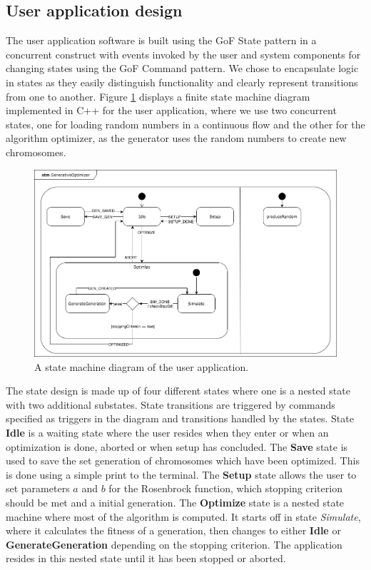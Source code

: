 \subsection{User application design}

The user application software is built using the GoF State pattern in a concurrent construct with events invoked by the user and system components for changing states using the GoF Command pattern. We chose to encapsulate logic in states as they easily distinguish functionality and clearly represent transitions from one to another. Figure \ref{fig:statemachine} displays a finite state machine diagram implemented in C++ for the user application, where we use two concurrent states, one for loading random numbers in a continuous flow and the other for the algorithm optimizer, as the generator uses the random numbers to create new chromosomes.

\begin{figure}[h!]
	\centering
	\includegraphics[width=0.9\linewidth]{../diagrams/statemachine.png}
	\caption{A state machine diagram of the user application.}
	\label{fig:statemachine}
\end{figure}

The state design is made up of four different states where one is a nested state with two additional substates.
State transitions are triggered by commands specified as triggers in the diagram and transitions handled by the states. State \textbf{Idle} is a waiting state where the user resides when they enter or when an optimization is done, aborted or when setup has concluded. The \textbf{Save} state is used to save the set generation of chromosomes which have been optimized. This is done using a simple print to the terminal. The \textbf{Setup} state allows the user to set parameters $a$ and $b$ for the Rosenbrock function, which stopping criterion should be met and a initial generation. The \textbf{Optimize} state is a nested state machine where most of the algorithm is computed. It starts off in state \emph{Simulate}, where it calculates the fitness of a generation, then changes to either \textbf{Idle} or \textbf{GenerateGeneration} depending on the stopping criterion. The application resides in this nested state until it has been stopped or aborted.

